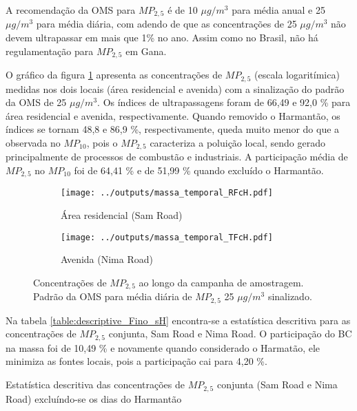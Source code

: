 A recomendação da OMS para $MP_{2,5}$ é de 10 $\mu g/m^3$ para média anual e 
25 $\mu g/m^3$ para média diária, com adendo de que as concentrações de 
25 $\mu g/m^3$ não devem ultrapassar em mais que 1\% no ano. Assim como no
Brasil, não há regulamentação para $MP_{2,5}$ em Gana. 

O gráfico da figura \ref{fig:massa_temporal_mp2.5} apresenta as concentrações
de $MP_{2,5}$ (escala logaritímica) medidas nos dois locais 
(área residencial e avenida) com a sinalização do padrão da OMS de 
25 $\mu g/m^3$. Os índices de ultrapassagens foram de 66,49 e 92,0 \% 
para área residencial e avenida, respectivamente. Quando removido o Harmantão, 
os índices se tornam 48,8 e 86,9 \%, respectivamente, queda muito menor do 
que a observada no $MP_{10}$, pois o $MP_{2,5}$ caracteriza a poluição local, 
sendo gerado principalmente de processos de combustão e industriais.
A participação média de $MP_{2,5}$ no $MP_{10}$ foi de 64,41 \% e de 
51,99 \% quando excluído o Harmantão.

\begin{figure}[H]
  \centering
  \begin{subfigure}[b]{0.45\textwidth}
    \texttt{[image: ../outputs/massa\_temporal\_RFcH.pdf]}
    \caption{Área residencial (Sam Road)}
  \end{subfigure}%
  \begin{subfigure}[b]{0.45\textwidth}
    \texttt{[image: ../outputs/massa\_temporal\_TFcH.pdf]}
    \caption{Avenida (Nima Road)}
  \end{subfigure}
  \caption{Concentrações de $MP_{2,5}$ ao longo da campanha de amostragem. 
           Padrão da OMS para média diária de $MP_{2,5}$ 25 $\mu g/m^3$ sinalizado.
           \label{fig:massa_temporal_mp2.5}}
\end{figure}

Na tabela \ref{table:descriptive_Fino_sH} encontra-se a estatística 
descritiva para as concentrações de $MP_{2,5}$ conjunta, Sam Road e Nima Road. 
O participação do BC na massa foi de 10,49 \% e novamente quando considerado 
o Harmatão, ele minimiza as fontes locais, pois a participação cai para 4,20 \%.

\begin{table}[H]
  \centering
    
  \caption{Estatística descritiva das concentrações de $MP_{2,5}$ conjunta 
           (Sam Road e Nima Road) excluíndo-se os dias do Harmantão
            \label{table:descriptive_Fino_sH}}
\end{table}

